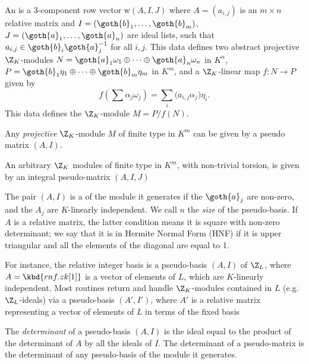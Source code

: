 \item An  is a 3-component row vector w$(A,I,J)$
where $A = (a_{i,j})$ is an $m\times n$ relative matrix and $I =
(\goth{b}_1,\dots, \goth{b}_m)$, $J = (\goth{a}_1,\dots, \goth{a}_n)$ are ideal
lists, such that $a_{i,j} \in \goth{b}_i \goth{a}_j^{-1}$ for all $i,j$. This
data defines two abstract projective $\Z_K$-modules
$N = \goth{a}_1\omega_1\oplus \cdots\oplus \goth{a}_n\omega_n $ in $K^n$,
$P = \goth{b}_1\eta_1\oplus \cdots\oplus \goth{b}_m\eta_m$ in $K^m$, and a
$\Z_K$-linear map $f:N\to P$ given by
$$ f(\sum \alpha_j\omega_j) = \sum_i \Big(a_{i,j}\alpha_j\Big) \eta_i.$$
This data defines the $\Z_K$-module $M = P/f(N)$.

\item Any \emph{projective} $\Z_K$-module $M$
of finite type in $K^m$ can be given by a pseudo matrix $(A,I)$.

\item An arbitrary $\Z_K$ modules of finite type in $K^m$, with non-trivial
torsion, is given by an integral pseudo-matrix $(A,I,J)$


\item The pair $(A,I)$ is a  of the module it
generates if the $\goth{a}_j$ are non-zero, and the $A_j$ are $K$-linearly
independent. We call $n$ the \emph{size} of the pseudo-basis. If $A$ is a
relative matrix, the latter condition means it is square with non-zero
determinant; we say that it is in Hermite Normal
Form (HNF) if it is upper triangular and all the
elements of the diagonal are equal to 1.

\item For instance, the relative integer basis  is a pseudo-basis
$(A,I)$ of $\Z_L$, where $A = \kbd{rnf.zk[1]}$ is a vector of elements of $L$,
which are $K$-linearly independent. Most  routines return and handle
$\Z_K$-modules contained in $L$ (e.g.~$\Z_L$-ideals) via a pseudo-basis
$(A',I')$, where $A'$ is a relative matrix representing a vector of elements of
$L$ in terms of the fixed basis 

\item The \emph{determinant} of a pseudo-basis $(A,I)$ is the ideal
equal to the product of the determinant of $A$ by all the ideals of $I$. The
determinant of a pseudo-matrix is the determinant of any pseudo-basis of the
module it generates.

